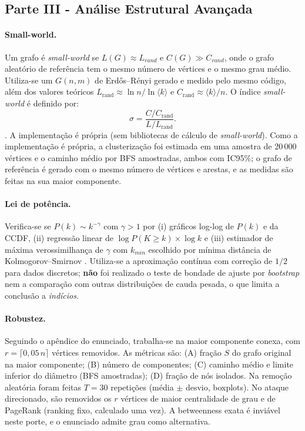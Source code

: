 \documentclass[sigconf]{webmedia}
\begin{document}
\subsection{Parte III - Análise Estrutural Avançada}
\paragraph{Small-world.}
Um grafo é \emph{small-world} se $L(G)\approx L_{rand}$ e $C(G)\gg C_{rand}$, onde o grafo aleatório de referência tem o mesmo número de vértices e o mesmo grau médio. 
Utiliza-se um $G(n,m)$ de Erdős--Rényi \cite{erdos1959}
gerado e medido pelo mesmo código, além dos valores teóricos
$L_{\mathrm{rand}}\approx\ln n/\ln\langle k\rangle$ e
$C_{\mathrm{rand}}\approx\langle k\rangle/n$.
O índice \emph{small-world} é definido por:
\begin{equation}
  \sigma =
  \frac{C/C_{\mathrm{rand}}}{L/L_{\mathrm{rand}}}.
\end{equation}
\cite{watts1998}. 
A implementação é própria (sem bibliotecas de cálculo de \emph{small-world}).
Como a implementação é própria, a clusterização foi estimada em uma amostra de 20\,000 vértices e o caminho médio por BFS amostradas, ambos com IC95\%; o grafo de referência é gerado com o mesmo número de vértices e arestas, e as medidas são feitas na sua maior componente.

\paragraph{Lei de potência.}
Verifica-se se $P(k)\sim k^{-\gamma}$ com $\gamma>1$ por (i) gráficos log-log de $P(k)$ e da CCDF, (ii) regressão linear de $\log P(K\ge k)\times\log k$ e (iii) estimador de máxima verossimilhança de $\gamma$ com $k_{min}$ escolhido por mínima distância de Kolmogorov--Smirnov \cite{clauset2009}. Utiliza-se a aproximação contínua com correção de $1/2$ para dados discretos; \textbf{não} foi realizado o teste de bondade de ajuste por \emph{bootstrap} nem a comparação com outras distribuições de cauda pesada, o que limita a conclusão a \emph{indícios}.

\paragraph{Robustez.}
Seguindo o apêndice do enunciado, trabalha-se na maior componente conexa, com $r=\lceil 0{,}05\,n\rceil$ vértices removidos. As métricas são: (A) fração $S$ do grafo original na maior componente; (B) número de componentes; (C) caminho médio e limite inferior do diâmetro (BFS amostradas); (D) fração de nós isolados. Na remoção aleatória foram feitas $T=30$ repetições (média $\pm$ desvio, boxplots). No ataque direcionado, são removidos os $r$ vértices de maior centralidade de grau e de PageRank (ranking fixo, calculado uma vez). A betweenness exata é inviável neste porte, e o enunciado admite grau como alternativa.
\end{document}
